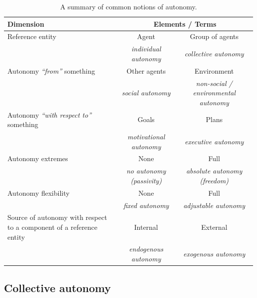 \begin{table}
  \centering
  \def\arraystretch{1.4}%
  \begin{tabularx}{\textwidth}{|p{}|X|X|X|X|}
  \hline
  \textbf{Dimension} & \multicolumn{4}{c|}{\textbf{Elements / Terms}}
  \\\hline
  Reference entity & \multicolumn{2}{c|}{Agent} & \multicolumn{2}{c|}{Group of agents}
  \\\hline
  & \multicolumn{2}{c|}{\emph{individual autonomy}} & \multicolumn{2}{c|}{\emph{collective autonomy}}
  \\\hline\hline
  Autonomy \emph{``from''} something & \multicolumn{2}{c|}{Other agents} & \multicolumn{2}{c|}{Environment}
  \\\hline
  & \multicolumn{2}{c|}{\emph{social autonomy}} & \multicolumn{2}{c|}{\emph{non-social / environmental autonomy}}
  \\\hline\hline
  Autonomy \emph{``with respect to''} something & \multicolumn{2}{c|}{Goals} & \multicolumn{2}{c|}{Plans}
  \\\hline
  & \multicolumn{2}{c|}{\emph{motivational autonomy}} & \multicolumn{2}{c|}{\emph{executive autonomy}}
  \\\hline\hline
  Autonomy extremes & \multicolumn{2}{c|}{None} & \multicolumn{2}{c|}{Full}
  \\\hline
  & \multicolumn{2}{c|}{\emph{no autonomy (passivity)}} & \multicolumn{2}{c|}{\emph{absolute autonomy (freedom)}}
  \\\hline
  Autonomy flexibility & \multicolumn{2}{c|}{None} & \multicolumn{2}{c|}{Full}
  \\\hline
  & \multicolumn{2}{c|}{\emph{fixed autonomy}} & \multicolumn{2}{c|}{\emph{adjustable autonomy}}
  \\\hline
  Source of autonomy with respect to a component of a reference entity & \multicolumn{2}{c|}{Internal} & \multicolumn{2}{c|}{External}
  \\\hline
  & \multicolumn{2}{c|}{\emph{endogenous autonomy}} & \multicolumn{2}{c|}{\emph{exogenous autonomy}}
  \\\hline
  \end{tabularx}
  \caption{A summary of common notions of autonomy.}
  \label{mdpi2020:table:autonomy-notions}
  \end{table}

\subsection{Collective autonomy}\label{mdpi2020:s:collective-autonomy}


